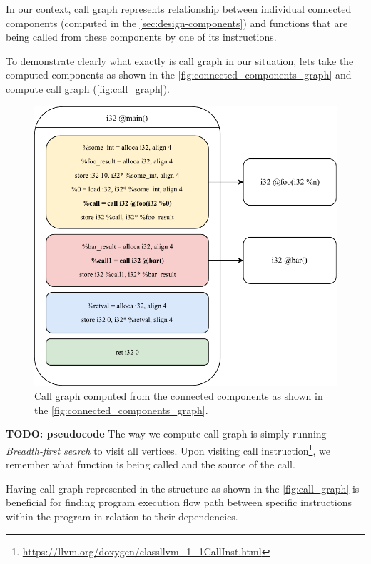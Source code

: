 \documentclass[12pt, twoside]{fithesis2}
\renewcommand{\_}{\leavevmode \kern0.07em\vbox{\hrule width0.4em}}
\begin{document}
In our context, call graph represents relationship between individual
connected components (computed in the \autoref{sec:design-components})
and functions that are being called from these components by one of its
instructions.

To demonstrate clearly what exactly is call graph in our situation, lets take
the computed components as shown in the \autoref{fig:connected_components_graph}
and compute call graph (\autoref{fig:call_graph}).

\begin{figure}[ht]
    \centering
    \includegraphics[]{images/main_callgraph.pdf}
    \caption{Call graph computed from the connected components
    as shown in the \autoref{fig:connected_components_graph}.}
    \label{fig:call_graph}
\end{figure}

\textbf{TODO: pseudocode}
The way we compute call graph is simply running \emph{Breadth-first search}
to visit all vertices.
Upon visiting call instruction\footnote{\url{https://llvm.org/doxygen/classllvm_1_1CallInst.html}},
we remember what function is being called and the source of the call.

Having call graph represented in the structure as shown in the
\autoref{fig:call_graph}
is beneficial for finding
program execution flow path between specific instructions within the program in
relation to their dependencies.
\end{document}
